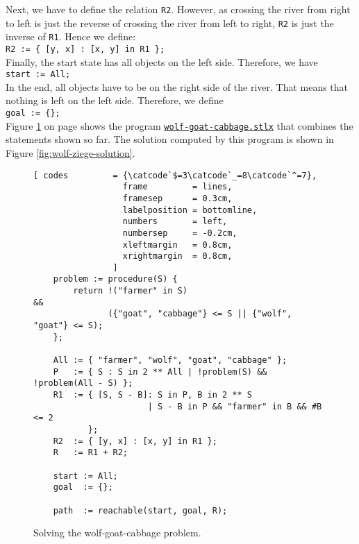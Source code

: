 Next, we have to define the relation \texttt{R2}.  However, as crossing the river from right to left
is just the reverse of crossing the river from left to right, \texttt{R2} is just the inverse of
\texttt{R1}.   Hence we define:
\\[0.2cm]
\hspace*{1.3cm}
\texttt{R2  := \{ [y, x] : [x, y] in R1 \};}
\\[0.2cm]
Finally, the start state has all objects on the left side.  Therefore, we have
\\[0.2cm]
\hspace*{1.3cm}
\texttt{start := All;}
\\[0.2cm]
In the end, all objects have to be on the right side of the river.  That means that nothing is left
on the left side.  Therefore, we define
\\[0.2cm]
\hspace*{1.3cm}
\texttt{goal := \{\};}
\\[0.2cm]
Figure \ref{fig:wolf-ziege} on page \pageref{fig:wolf-ziege} shows the program
\href{https://github.com/karlstroetmann/Logik/blob/master/SetlX/wolf-goat-cabbage.stlx}{\texttt{wolf-goat-cabbage.stlx}}
that combines the statements shown so far.  The solution computed by this program is shown in Figure
 \ref{fig:wolf-ziege-solution}.

\begin{figure}[!ht]
  \centering
\begin{Verbatim}[ codes         = {\catcode`$=3\catcode`_=8\catcode`^=7},
                  frame         = lines, 
                  framesep      = 0.3cm, 
                  labelposition = bottomline,
                  numbers       = left,
                  numbersep     = -0.2cm,
                  xleftmargin   = 0.8cm,
                  xrightmargin  = 0.8cm,
                ]
    problem := procedure(S) {
        return !("farmer" in S)                                     && 
               ({"goat", "cabbage"} <= S || {"wolf", "goat"} <= S);
    };
    
    All := { "farmer", "wolf", "goat", "cabbage" };
    P   := { S : S in 2 ** All | !problem(S) && !problem(All - S) };
    R1  := { [S, S - B]: S in P, B in 2 ** S
                       | S - B in P && "farmer" in B && #B <= 2
           };
    R2  := { [y, x] : [x, y] in R1 };
    R   := R1 + R2;
    
    start := All;
    goal  := {};
    
    path  := reachable(start, goal, R);
\end{Verbatim} 
\vspace*{-0.3cm}
\caption{Solving the wolf-goat-cabbage problem.}  
\label{fig:wolf-ziege}
\end{figure}


